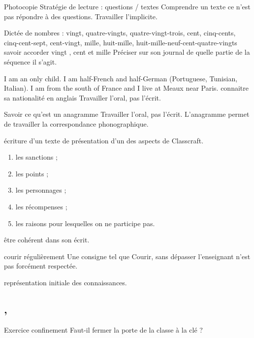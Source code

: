 \documentclass{article}
\begin{document}
	\Dis\cfr{}
	\Ces Photocopie
	\obj Stratégie de lecture : questions / textes
	\nte Comprendre un texte ce n’est pas répondre à des questions. Travailler l’implicite.
	
	\dis\cma{}
	\Cdj Dictée de nombres : vingt, quatre-vingts, quatre-vingt-trois, cent, cinq-cents, cinq-cent-sept, cent-vingt, mille, huit-mille, huit-mille-neuf-cent-quatre-vingts
	\obj savoir accorder \og vingt \fg{}, \og cent \fg et \og mille \fg{}
	\nte Préciser sur son journal de quelle partie de la séquence il s’agit.
	
	\Dis\cen{} I am an only child. I am half-French and half-German (Portuguese, Tunisian, Italian). I am from the south of France and I live at Meaux near Paris.
	\obj connaitre sa nationalité en anglais
	\nte Travailler l’oral, pas l’écrit.
	
	\dis\cfr{}
	\obj Savoir ce qu’est un anagramme
	\bil Travailler l’oral, pas l’écrit.
	\nte L’anagramme permet de travailler la correspondance phonographique.
	
	\Dis\cfr{}
	\Ces écriture d’un texte de présentation d’un des aspects de Classcraft.
	\begin{enumerate}
		\item les sanctions ;
		\item les points ;
		\item les personnages ;
		\item les récompenses ;
		\item les raisons pour lesquelles on ne participe pas.
	\end{enumerate}
	\obj être cohérent dans son écrit.
	
	\Dis\csp{}
	\obj courir régulièrement
	\bil Une consigne tel que \og Courir, sans dépasser l’enseignant \fg{} n’est pas forcément respectée.
	
	
	\Dis\csi{}
	\obj représentation initiale des connaissances.	
	
	
	\subsection{ \sep}
	\nte Exercice confinement
	\bil Faut-il fermer la porte de la classe à la clé ?
	
\end{document}
